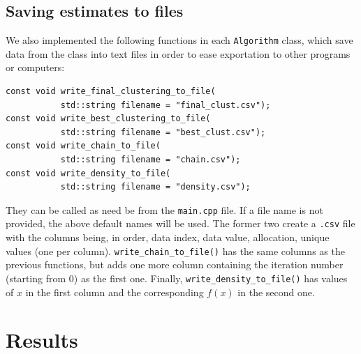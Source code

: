 \subsection{Saving estimates to files}
We also implemented the following functions in each \verb|Algorithm| class, which save data from the class into text files in order to ease exportation to other programs or computers:
\begin{verbatim}
const void write_final_clustering_to_file(
           std::string filename = "final_clust.csv");
const void write_best_clustering_to_file(
           std::string filename = "best_clust.csv");
const void write_chain_to_file(
           std::string filename = "chain.csv");
const void write_density_to_file(
           std::string filename = "density.csv");
\end{verbatim}
They can be called as need be from the \verb|main.cpp| file.
If a file name is not provided, the above default names will be used.
The former two create a \verb|.csv| file with the columns being, in order, data index, data value, allocation, unique values (one per column).
\verb|write_chain_to_file()| has the same columns as the previous functions, but adds one more column containing the iteration number (starting from $0$) as the first one.
Finally, \verb|write_density_to_file()| has values of $x$ in the first column and the corresponding $f(x)$ in the second one.

\section{Results}
